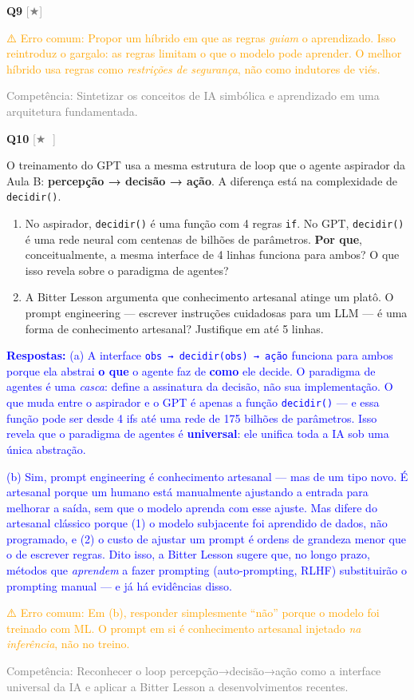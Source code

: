 \documentclass[12pt,a4paper]{article}
\newcommand{\sol}[1]{\textcolor{blue}{#1}}
\newcommand{\errocomum}[1]{\textcolor{orange}{⚠️ Erro comum: #1}}
\newcommand{\competencia}[1]{\textcolor{gray}{Competência: #1}}
\newcommand{\sol}[1]{}
\newcommand{\errocomum}[1]{}
\newcommand{\competencia}[1]{}
\newcommand{\sol}[1]{}
\newcommand{\errocomum}[1]{}
\newcommand{\competencia}[1]{}
\newcommand{\nivel}[1]{\textcolor{gray}{[#1]}}
\newenvironment{questao}[2]{
  \vspace{0.5cm}
  \noindent\textbf{Q#1} \nivel{#2} \quad
}{
  \vspace{0.2cm}
}
\begin{document}
\begin{questao}{9}{★}
{    \errocomum{Propor um híbrido em que as regras \textit{guiam} o aprendizado. Isso
    reintroduz o gargalo: as regras limitam o que o modelo pode aprender. O melhor
    híbrido usa regras como \textit{restrições de segurança}, não como indutores de viés.}

    \competencia{Sintetizar os conceitos de IA simbólica e aprendizado em uma arquitetura
    fundamentada.}
  }
\end{questao}

\begin{questao}{10}{★ 🌉}
  O treinamento do GPT usa a mesma estrutura de loop que o agente aspirador da Aula B:
  \textbf{percepção → decisão → ação}. A diferença está na complexidade de \texttt{decidir()}.

  \begin{enumerate}[label=(\alph*),nosep]
    \item No aspirador, \texttt{decidir()} é uma função com 4 regras \texttt{if}.
    No GPT, \texttt{decidir()} é uma rede neural com centenas de bilhões de
    parâmetros. \textbf{Por que}, conceitualmente, a mesma interface de 4 linhas
    funciona para ambos? O que isso revela sobre o paradigma de agentes?
    \item A Bitter Lesson argumenta que conhecimento artesanal atinge um platô.
    O prompt engineering — escrever instruções cuidadosas para um LLM — é uma
    forma de conhecimento artesanal? Justifique em até 5 linhas.
  \end{enumerate}

  \sol{
    \textbf{Respostas:}
    (a) A interface \texttt{obs → decidir(obs) → ação} funciona para ambos porque ela
    abstrai \textbf{o que} o agente faz de \textbf{como} ele decide. O paradigma de
    agentes é uma \textit{casca}: define a assinatura da decisão, não sua implementação.
    O que muda entre o aspirador e o GPT é apenas a função \texttt{decidir()} — e essa
    função pode ser desde 4 ifs até uma rede de 175 bilhões de parâmetros. Isso revela
    que o paradigma de agentes é \textbf{universal}: ele unifica toda a IA sob uma
    única abstração.

    (b) Sim, prompt engineering é conhecimento artesanal — mas de um tipo novo. É
    artesanal porque um humano está manualmente ajustando a entrada para melhorar
    a saída, sem que o modelo aprenda com esse ajuste. Mas difere do artesanal
    clássico porque (1) o modelo subjacente foi aprendido de dados, não programado,
    e (2) o custo de ajustar um prompt é ordens de grandeza menor que o de escrever
    regras. Dito isso, a Bitter Lesson sugere que, no longo prazo, métodos que
    \textit{aprendem} a fazer prompting (auto-prompting, RLHF) substituirão o
    prompting manual — e já há evidências disso.

    \errocomum{Em (b), responder simplesmente ``não'' porque o modelo foi treinado com ML.
    O prompt em si é conhecimento artesanal injetado \textit{na inferência}, não no treino.}

    \competencia{Reconhecer o loop percepção→decisão→ação como a interface universal
    da IA e aplicar a Bitter Lesson a desenvolvimentos recentes.}
  }
\end{questao}
\end{document}
